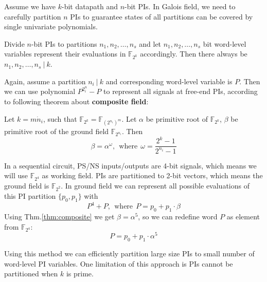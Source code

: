 Assume we have $k$-bit datapath and $n$-bit PIs. In Galois field, we need to carefully partition $n$ PIs
to guarantee states of all partitions can be covered by single univariate polynomials.

\begin{Proposition}
Divide $n$-bit PIs to partitions $n_1,n_2,\dots, n_s$ and let $n_1,n_2,\dots,n_s$ bit word-level variables
represent their evaluations in $\mathbb F_{2^k}$ accordingly. Then there always be $n_1,n_2,\dots,n_s~|~k$.
\end{Proposition}

Again, assume a partition $n_i~|~k$ and corresponding word-level variable is $P$. Then we can use polynomial
$P^{2^n_i}-P$ to represent all signals at free-end PIs, according to following theorem about {\bf composite
field}:
\begin{Theorem}
\label{thm:composite}
Let $k = m\dot n_i$, such that $\mathbb F_{2^k} = \mathbb F_{(2^{n_i})^m}$. Let $\alpha$ be primitive root of 
$\mathbb F_{2^k}$, $\beta$ be primitive root of the ground field $\mathbb F_{2^{n_i}}$. Then
$$\beta = \alpha^\omega,~~\text{where}~~\omega = \frac{2^k-1}{2^{n_i}-1}$$
\end{Theorem}
\begin{Example}
In a sequential circuit, PS/NS inputs/outputs are 4-bit signals, which means we will use $\mathbb F_{2^4}$
as working field. PIs are partitioned to 2-bit vectors, which means the ground field is $\mathbb F_{2^2}$.
In ground field we can represent all possible evaluations of this PI partition $\{p_0,p_1\}$ with
$$P^4+P,~~\text{where}~~P=p_0+p_1\cdot\beta$$
Using Thm.\ref{thm:composite} we get $\beta = \alpha^5$, so we can redefine word $P$ as element from $\mathbb F_{2^4}$:
$$P = p_0 + p_1\cdot\alpha^5$$
\end{Example}
Using this method we can efficiently partition large size PIs to small number of word-level PI variables.
One limitation of this approach is PIs cannot be partitioned when $k$ is prime.